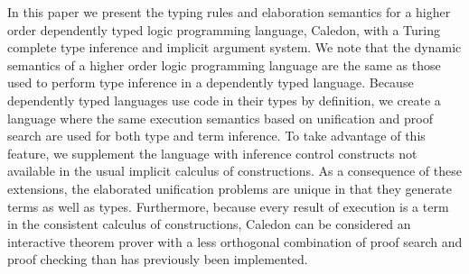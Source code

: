 In this paper we present the typing rules and elaboration semantics for a higher order dependently typed logic programming language, Caledon, 
    with a Turing complete type inference and implicit argument system.  
We note that the dynamic semantics of a higher order logic programming language are the same as those used to perform type inference in a
    dependently typed language.
Because dependently typed languages use code in their types by definition, we create a language where the same 
    execution semantics based on unification and proof search are used for both type and term inference.  
To take advantage of this feature,
    we supplement the language with inference control constructs not available in the usual implicit calculus of constructions.
As a consequence of these extensions,
    the elaborated unification problems are unique in that they generate terms as well as types.
Furthermore, because every result of execution is a term in the consistent calculus of constructions, Caledon can be considered 
    an interactive theorem prover with a less orthogonal combination of proof search and proof checking than has previously been implemented.
